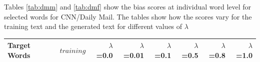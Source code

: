 \documentclass[11pt,a4paper]{article}
\begin{document}
\noindent Tables \ref{tab:dmm} and \ref{tab:dmf} show the bias scores at individual word level for selected words for CNN/Daily Mail. The tables show how the scores vary for the training text and the generated text for different values of  $\lambda$




\begin{table}[b]
\small
\centering
    \begin{tabular}{|l|r|r|r|r|r|r|r|}
     \toprule
     
    \textbf{Target Words}  & \textbf{$training$} & \textbf{$\lambda$}{=0.0}  &
    \textbf{$\lambda$}{=0.01}&
    \textbf{$\lambda$}{=0.1}& \textbf{$\lambda$}{=0.5} & \textbf{$\lambda$}{=0.8} & \textbf{$\lambda$}{=1.0}   \\
      \midrule
      


\end{tabular}
\end{table}
\end{document}

